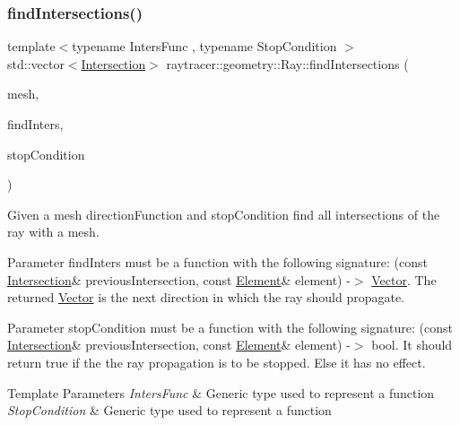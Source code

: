\subsubsection{\texorpdfstring{find\+Intersections()}{findIntersections()}}
{\footnotesize\ttfamily template$<$typename Inters\+Func , typename Stop\+Condition $>$ \\
std\+::vector$<$\hyperlink{structraytracer_1_1geometry_1_1Intersection}{Intersection}$>$ raytracer\+::geometry\+::\+Ray\+::find\+Intersections (\begin{DoxyParamCaption}\item[{const \hyperlink{classraytracer_1_1geometry_1_1Mesh}{Mesh} \&}]{mesh,  }\item[{Inters\+Func}]{find\+Inters,  }\item[{Stop\+Condition}]{stop\+Condition }\end{DoxyParamCaption})\hspace{0.3cm}{\ttfamily [inline]}}



Given a mesh direction\+Function and stop\+Condition find all intersections of the ray with a mesh. 

Parameter find\+Inters must be a function with the following signature\+: (const \hyperlink{structraytracer_1_1geometry_1_1Intersection}{Intersection}\& previous\+Intersection, const \hyperlink{classraytracer_1_1geometry_1_1Element}{Element}\& element) -\/$>$ \hyperlink{classraytracer_1_1geometry_1_1Vector}{Vector}. The returned \hyperlink{classraytracer_1_1geometry_1_1Vector}{Vector} is the next direction in which the ray should propagate.

Parameter stop\+Condition must be a function with the following signature\+: (const \hyperlink{structraytracer_1_1geometry_1_1Intersection}{Intersection}\& previous\+Intersection, const \hyperlink{classraytracer_1_1geometry_1_1Element}{Element}\& element) -\/$>$ bool. It should return true if the the ray propagation is to be stopped. Else it has no effect.


\begin{DoxyTemplParams}{Template Parameters}
{\em Inters\+Func} & Generic type used to represent a function \\
\hline
{\em Stop\+Condition} & Generic type used to represent a function \\
\hline
\end{DoxyTemplParams}

